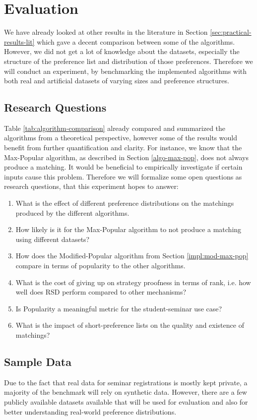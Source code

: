 \section{Evaluation}\label{sec:evaluation}
We have already looked at other results in the literature in Section \ref{sec:practical-results-lit} which gave a decent comparison between some of the algorithms. However, we did not get a lot of knowledge about the datasets, especially the structure of the preference list and distribution of those preferences. Therefore we will conduct an experiment, by benchmarking the implemented algorithms with both real and artificial datasets of varying sizes and preference structures.

\subsection{Research Questions}\label{sec:research-q}
Table \ref{tab:algorithm-comparison} already compared and summarized the algorithms from a theoretical perspective, however some of the results would benefit from further quantification and clarity. For instance, we know that the Max-Popular algorithm, as described in Section \ref{algo-max-pop}, does not always produce a matching. It would be beneficial to empirically investigate if certain inputs cause this problem. Therefore we will formalize some open questions as research questions, that this experiment hopes to answer:
\begin{enumerate}
    \item What is the effect of different preference distributions on the matchings produced by the different algorithms.
    \item How likely is it for the Max-Popular algorithm to not produce a matching using different datasets?
    \item How does the Modified-Popular algorithm from Section \ref{impl:mod-max-pop} compare in terms of popularity to the other algorithms.
    \item What is the cost of giving up on strategy proofness in terms of rank, i.e. how well does RSD perform compared to other mechanisms?
    \item Is Popularity a meaningful metric for the student-seminar use case?
    \item What is the impact of short-preference lists on the quality and existence of matchings?
\end{enumerate}

\subsection{Sample Data}
Due to the fact that real data for seminar registrations is mostly kept private, a majority of the benchmark will rely on synthetic data. However, there are a few publicly available datasets available that will be used for evaluation and also for better understanding real-world preference distributions.


